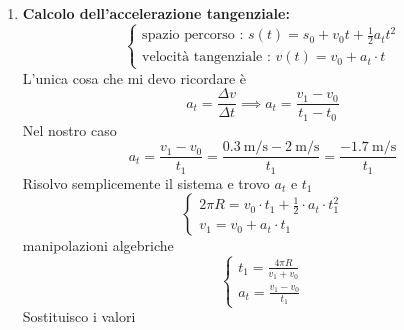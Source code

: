 \documentclass{article}
\begin{document}
\begin{enumerate}[label=\arabic*]
          \begin{enumerate}[label=\alph*)]
              \item \textbf{Calcolo dell'accelerazione tangenziale:} \\
                    \begin{equation*}
                        \begin{cases}
                            \text{spazio percorso : } s(t) = s_0 + v_0 t + \frac{1}{2} a_t t^2 \\
                            \text{velocità tangenziale : } v(t) = v_0 + a_t \cdot t
                        \end{cases}
                    \end{equation*}
                    L'unica cosa che mi devo ricordare è
                    \begin{equation*}
                        \boxed{a_t = \frac{\Delta v}{\Delta t}} \implies \boxed{a_t = \frac{v_1 - v_0}{t_1 - t_0}}
                    \end{equation*}
                    Nel nostro caso
                    \begin{equation*}
                        a_t = \frac{v_1 - v_0}{t_1} = \frac{\SI{0.3}{\meter\per\second} - \SI{2}{\meter\per\second}}{t_1} = \frac{\SI{-1.7}{\meter\per\second}}{t_1}
                    \end{equation*}
                    Risolvo semplicemente il sistema e trovo \(a_t\) e \(t_1\)
                    \begin{equation*}
                        \begin{cases}
                            2\pi R=  v_0 \cdot t_1 + \frac{1}{2} \cdot a_t \cdot t_1^2 \\
                            v_1 = v_0 + a_t \cdot t_1
                        \end{cases}
                    \end{equation*}
                    manipolazioni algebriche
                    \begin{equation*}
                        \begin{cases}
                            t_1 = \frac{4\pi R}{v_1+v_0} \\
                            a_t = \frac{v_1 - v_0}{t_1}
                        \end{cases}
                    \end{equation*}
                    Sostituisco i valori
                    \begin{equation*}

\end{equation*}
\end{enumerate}
\end{enumerate}
\end{document}
